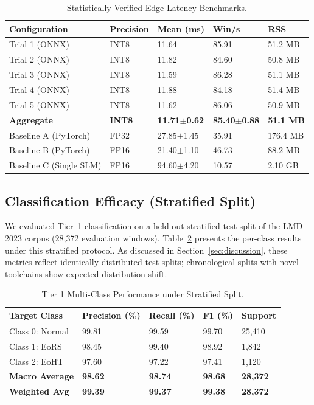 \documentclass[10pt,journal,compsoc]{IEEEtran}
\begin{document}
\begin{table}[htbp]
\centering
\caption{Statistically Verified Edge Latency Benchmarks.}
\label{tab:latency}
\begin{tabular}{lllll}
\toprule
\textbf{Configuration} & \textbf{Precision} & \textbf{Mean (ms)} & \textbf{Win/s} & \textbf{RSS} \\
\midrule
Trial 1 (ONNX) & INT8 & 11.64 & 85.91 & 51.2 MB \\
Trial 2 (ONNX) & INT8 & 11.82 & 84.60 & 50.8 MB \\
Trial 3 (ONNX) & INT8 & 11.59 & 86.28 & 51.1 MB \\
Trial 4 (ONNX) & INT8 & 11.88 & 84.18 & 51.4 MB \\
Trial 5 (ONNX) & INT8 & 11.62 & 86.06 & 50.9 MB \\
\textbf{Aggregate} & \textbf{INT8} & \textbf{11.71$\pm$0.62} & \textbf{85.40$\pm$0.88} & \textbf{51.1 MB} \\
Baseline A (PyTorch) & FP32 & 27.85$\pm$1.45 & 35.91 & 176.4 MB \\
Baseline B (PyTorch) & FP16 & 21.40$\pm$1.10 & 46.73 & 88.2 MB \\
Baseline C (Single SLM) & FP16 & 94.60$\pm$4.20 & 10.57 & 2.10 GB \\
\bottomrule
\end{tabular}
\end{table}

\subsection{Classification Efficacy (Stratified Split)}
We evaluated Tier~1 classification on a held-out stratified test split of the LMD-2023 corpus (28,372 evaluation windows). Table~\ref{tab:class_perf} presents the per-class results under this stratified protocol. As discussed in Section~\ref{sec:discussion}, these metrics reflect identically distributed test splits; chronological splits with novel toolchains show expected distribution shift.

\begin{table}[htbp]
\centering
\caption{Tier 1 Multi-Class Performance under Stratified Split.}
\label{tab:class_perf}
\begin{tabular}{lllll}
\toprule
\textbf{Target Class} & \textbf{Precision (\%)} & \textbf{Recall (\%)} & \textbf{F1 (\%)} & \textbf{Support} \\
\midrule
Class 0: Normal & 99.81 & 99.59 & 99.70 & 25,410 \\
Class 1: EoRS & 98.45 & 99.40 & 98.92 & 1,842 \\
Class 2: EoHT & 97.60 & 97.22 & 97.41 & 1,120 \\
\textbf{Macro Average} & \textbf{98.62} & \textbf{98.74} & \textbf{98.68} & \textbf{28,372} \\
\textbf{Weighted Avg} & \textbf{99.39} & \textbf{99.37} & \textbf{99.38} & \textbf{28,372} \\
\bottomrule
\end{tabular}
\end{table}
\end{document}
